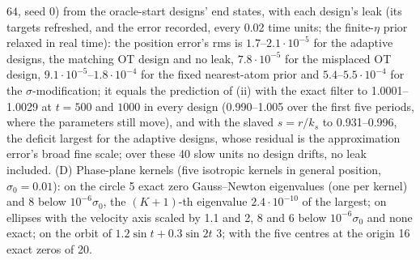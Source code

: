 $64$, seed 0) from the oracle-start designs' end states, with each design's leak (its targets refreshed, and the error
recorded, every 0.02 time units; the finite-$\eta$ prior relaxed in real time): the position error's rms is
$1.7$--$2.1\cdot10^{-5}$ for the adaptive designs, the matching OT design and no leak, $7.8\cdot10^{-5}$ for the
misplaced OT design, $9.1\cdot10^{-5}$--$1.8\cdot10^{-4}$ for the fixed nearest-atom prior and
$5.4$--$5.5\cdot10^{-4}$ for the $\sigma$-modification; it equals the prediction of (ii) with the exact filter to
1.0001--1.0029 at $t = 500$ and $1000$ in every design (0.990--1.005 over the first five periods, where the
parameters still move), and with the slaved $s = r/k_s$ to 0.931--0.996, the deficit largest for the adaptive designs,
whose residual is the approximation error's broad fine scale; over these 40 slow units no design drifts, no leak
included. (D) Phase-plane kernels (five isotropic kernels in general position, $\sigma_0 = 0.01$): on the circle 5
exact zero Gauss--Newton eigenvalues (one per kernel) and 8 below $10^{-6}\sigma_0$, the $(K + 1)$-th eigenvalue
$2.4\cdot10^{-10}$ of the largest; on ellipses with the velocity axis scaled by 1.1 and 2, 8 and 6 below
$10^{-6}\sigma_0$ and none exact; on the orbit of $1.2\sin t + 0.3\sin2t$ 3; with the five centres at the origin 16
exact zeros of 20.

